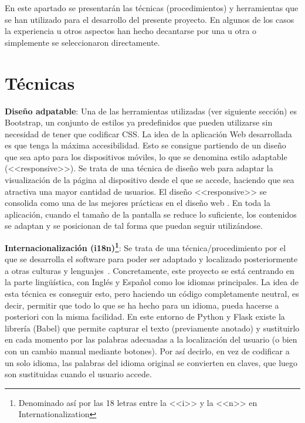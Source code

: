 
En este apartado se presentarán las técnicas (procedimientos) y herramientas que
se han utilizado para el desarrollo del presente proyecto. En algunos de los
casos la experiencia u otros aspectos han hecho decantarse por una u otra o
simplemente se seleccionaron directamente.

\section{Técnicas}

\textbf{Diseño adpatable}: Una de las herramientas utilizadas (ver siguiente sección) es Bootstrap, un
conjunto de estilos ya predefinidos que pueden utilizarse sin necesidad de tener
que codificar CSS. La idea de la aplicación Web desarrollada es que tenga la
máxima accesibilidad. Esto se consigue partiendo de un diseño que sea apto para
los dispositivos móviles, lo que se denomina estilo adaptable (<<responsive>>).
Se trata de una técnica de diseño web para adaptar la visualización de la página
al dispositivo desde el que se accede, haciendo que sea atractiva una mayor
cantidad de usuarios. El diseño <<responsive>> se consolida como una de las
mejores prácticas en el diseño web \cite{40defiebre}. En toda la aplicación,
cuando el tamaño de la pantalla se reduce lo suficiente, los contenidos se
adaptan y se posicionan de tal forma que puedan seguir utilizándose.

\textbf{Internacionalización (i18n)\footnote{Denominado así por las 18 letras
entre la <<i>> y la <<n>> en Internationalization}}: Se trata de una
técnica/procedimiento por el que se desarrolla el software para poder ser
adaptado y localizado posteriormente a otras culturas y
lenguajes~\cite{lokalise}. Concretamente, este proyecto se está centrando en la
parte lingüística, con Inglés y Español como los idiomas principales. La idea de
esta técnica es conseguir esto, pero haciendo un código completamente neutral,
es decir, permitir que todo lo que se ha hecho para un idioma, pueda hacerse a
posteriori con la misma facilidad. En este entorno de Python y Flask existe la
librería (Babel) que permite capturar el texto (previamente anotado) y
sustituirlo en cada momento por las palabras adecuadas a la localización del
usuario (o bien con un cambio manual mediante botones). Por así decirlo, en vez
de codificar a un solo idioma, las palabras del idioma original se convierten en
claves, que luego son sustituidas cuando el usuario accede.


